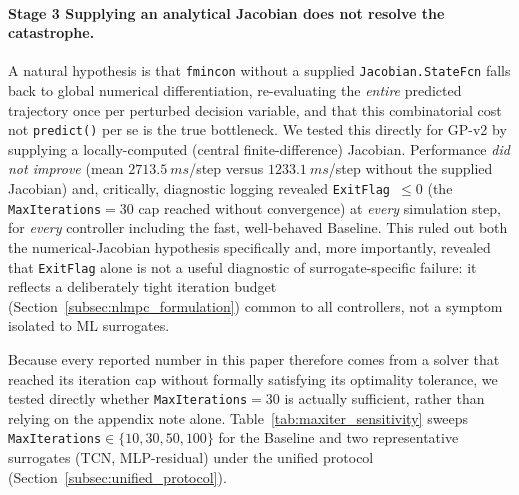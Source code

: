 \paragraph{Stage 3  Supplying an analytical Jacobian does not
resolve the catastrophe.} A natural hypothesis is that \texttt{fmincon}
without a supplied \texttt{Jacobian.StateFcn} falls back to global
numerical differentiation, re-evaluating the \emph{entire} predicted
trajectory once per perturbed decision variable, and that this
combinatorial cost  not \texttt{predict()} per se  is the true
bottleneck. We tested this directly for GP-v2 by supplying a
locally-computed (central finite-difference) Jacobian. Performance
\emph{did not improve} (mean $\SI{2713.5}{ms}$/step versus
$\SI{1233.1}{ms}$/step without the supplied Jacobian) and, critically,
diagnostic logging revealed \texttt{ExitFlag~$\le 0$} (the
\texttt{MaxIterations}$=30$ cap reached without convergence) at
\emph{every} simulation step, for \emph{every} controller including the
fast, well-behaved Baseline. This ruled out both the numerical-Jacobian
hypothesis specifically and, more importantly, revealed that
\texttt{ExitFlag} alone is not a useful diagnostic of surrogate-specific
failure: it reflects a deliberately tight iteration budget
(Section~\ref{subsec:nlmpc_formulation}) common to all controllers, not
a symptom isolated to ML surrogates.

\hspace{1.5cm} Because every reported number in this paper therefore comes from a
solver that reached its iteration cap without formally satisfying its
optimality tolerance, we tested directly whether
\texttt{MaxIterations}$=30$ is actually sufficient, rather than
relying on the appendix note alone. Table~\ref{tab:maxiter_sensitivity}
sweeps \texttt{MaxIterations}$\in\{10,30,50,100\}$ for the Baseline
and two representative surrogates (TCN, MLP-residual) under the
unified protocol (Section~\ref{subsec:unified_protocol}).

